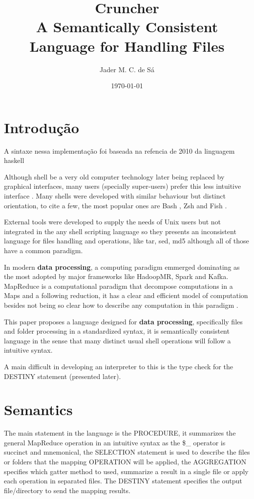 \documentclass{article}
\title{Cruncher\\
\large A Semantically Consistent Language for Handling Files}
\author{Jader M. C. de S\'{a}}
\date{\today}
\begin{document}
\maketitle

\section{Introdu\c{c}\~{a}o}

A sintaxe nessa implementação foi baseada na refencia de 2010 da linguagem
haskell \cite{marlow2010haskell}

Although shell be a very old computer technology later being replaced by
graphical interfaces, many users (specially super-users) prefer this less
intuitive interface \cite{negus2010linux,newham2005learning}. Many shells were
developed with similar behaviour but distinct orientation, to cite a few, the
most popular ones are Bash \cite{bash}, Zsh \cite{zsh} and Fish \cite{fish}.

External tools were developed to supply the needs of Unix users
but not integrated in the any shell scripting language so they presents an
inconsistent language for files handling and operations, like tar, sed, md5
although all of those have a common paradigm.

In modern \textbf{data processing}, a computing paradigm emmerged dominating
as the most adopted by major frameworks like HadoopMR, Spark and Kafka.
MapReduce is a computational paradigm that decompose computations in a
Maps and a following reduction, it has a clear and efficient model of
computation besides not being so clear how to describe any computation in
this paradigm \cite{afrati2012vision}.

This paper proposes a language designed for \textbf{data processing},
specifically files and folder processing in a standardized syntax, it is
semantically consistent language in the sense that many distinct usual shell
operations will follow a intuitive syntax.

A main difficult in developing an interpreter to this is the type
check for the DESTINY statement (presented later).


\section{Semantics}
The main statement in the language is the PROCEDURE, it summarizes the
general MapReduce operation in an intuitive syntax as the \$\_ operator is
succinct and mnemonical, the SELECTION statement is used to describe the
files or folders that the mapping OPERATION will be applied, the
AGGREGATION specifies which gatter method to used, summarize a result in
a single file or apply each operation in separated files. The DESTINY
statement specifies the output file/directory to send the mapping results.
\end{document}
